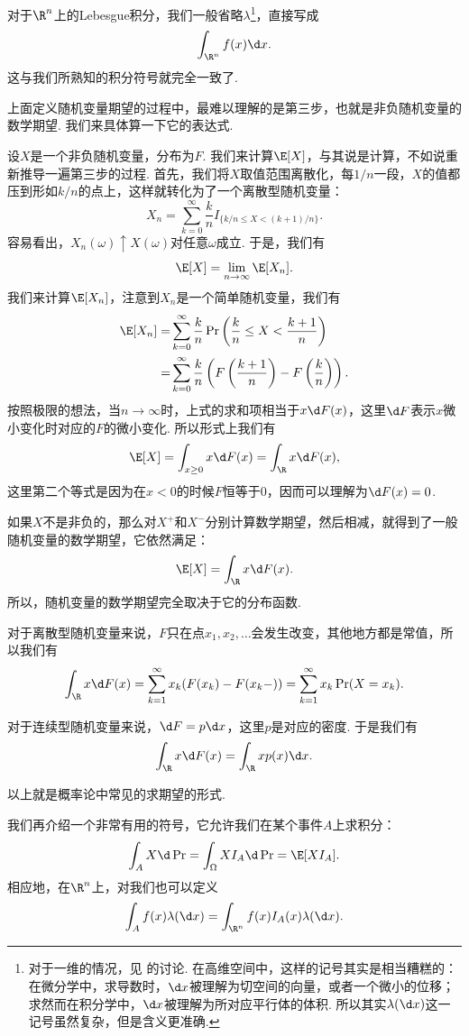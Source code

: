对于$\R^n$上的Lebesgue积分，我们一般省略$\lambda$\footnote{对于一维的情况，见 的讨论. 在高维空间中，这样的记号其实是相当糟糕的：在微分学中，求导数时，$\d x$被理解为切空间的向量，或者一个微小的位移；求然而在积分学中，$\d x$被理解为所对应平行体的体积. 所以其实$\lambda(\d x)$这一记号虽然复杂，但是含义更准确. }，直接写成
\[\int_{\R^n} f(x)\d x.\]
这与我们所熟知的积分符号就完全一致了. 

上面定义随机变量期望的过程中，最难以理解的是第三步，也就是非负随机变量的数学期望. 我们来具体算一下它的表达式. 

设$X$是一个非负随机变量，分布为$F$. 我们来计算$\E[X]$，与其说是计算，不如说重新推导一遍第三步的过程. 首先，我们将$X$取值范围离散化，每$1/n$一段，$X$的值都压到形如$k/n$的点上，这样就转化为了一个离散型随机变量：
\[X_n=\sum_{k=0}^\infty\frac{k}{n}I_{\{k/n\leq X<(k+1)/n\}}.\]
容易看出，$X_n(\omega)\uparrow X(\omega)$对任意$\omega$成立. 于是，我们有
\[\E[X]=\lim_{n\to\infty}\E[X_n].\]
我们来计算$\E[X_n]$，注意到$X_n$是一个简单随机变量，我们有
\begin{align*}
    \E[X_n]=&\sum_{k=0}^\infty\frac{k}{n}\Pr\left(\frac{k}{n}\leq X<\frac{k+1}{n}\right)\\
    =&\sum_{k=0}^\infty\frac{k}{n}\left(F\left(\frac{k+1}{n}\right)-F\left(\frac{k}{n}\right)\right).
\end{align*}
按照极限的想法，当$n\to\infty$时，上式的求和项相当于$x\d F(x)$，这里$\d F$表示$x$微小变化时对应的$F$的微小变化. 所以形式上我们有
\[\E[X]=\int_{x\geq 0} x\d F(x)=\int_\R x\d F(x),\]
这里第二个等式是因为在$x<0$的时候$F$恒等于$0$，因而可以理解为$\d F(x)=0$.

如果$X$不是非负的，那么对$X^+$和$X^-$分别计算数学期望，然后相减，就得到了一般随机变量的数学期望，它依然满足：
\[\E[X]=\int_{\R} x\d F(x).\]
所以，随机变量的数学期望完全取决于它的分布函数. 

对于离散型随机变量来说，$F$只在点$x_1,x_2,\dots$会发生改变，其他地方都是常值，所以我们有
\[\int_{\R} x\d F(x)=\sum_{k=1}^\infty x_k(F(x_k)-F(x_k-))=\sum_{k=1}^\infty x_k\Pr(X=x_k).\]

对于连续型随机变量来说，$\d F=p\d x$，这里$p$是对应的密度. 于是我们有
\[\int_{\R} x\d F(x)=\int_{\R} x p(x)\d x.\]

以上就是概率论中常见的求期望的形式. 

我们再介绍一个非常有用的符号，它允许我们在某个事件$A$上求积分：
\[\int_A X\d\Pr=\int_{\Omega} XI_A\d\Pr=\E[XI_A].\]
相应地，在$\R^n$上，对我们也可以定义
\[\int_A f(x)\lambda(\d x)=\int_{\R^n} f(x)I_A(x)\lambda(\d x).\]


